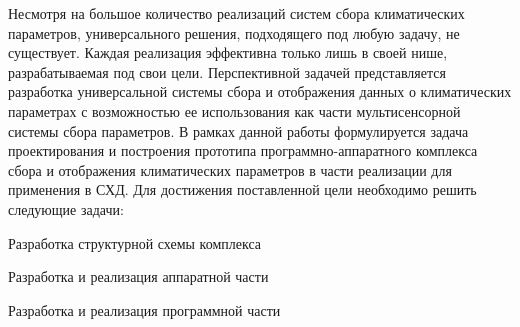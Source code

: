 Несмотря на большое количество реализаций систем сбора климатических параметров, универсального решения, подходящего под любую задачу, не существует. Каждая реализация эффективна только лишь в своей нише, разрабатываемая под свои цели. Перспективной задачей представляется разработка универсальной системы сбора и отображения данных о климатических параметрах с возможностью ее использования как части мультисенсорной системы сбора параметров.  В рамках данной работы формулируется задача проектирования и построения прототипа программно-аппаратного комплекса сбора и отображения климатических параметров в части реализации для применения в СХД. 
Для достижения поставленной цели необходимо решить следующие задачи:
\begin{itemize*}
	\item{Разработка структурной схемы комплекса}
	\item{Разработка и реализация аппаратной части}
	\item{Разработка и реализация программной части}
\end{itemize*}	

